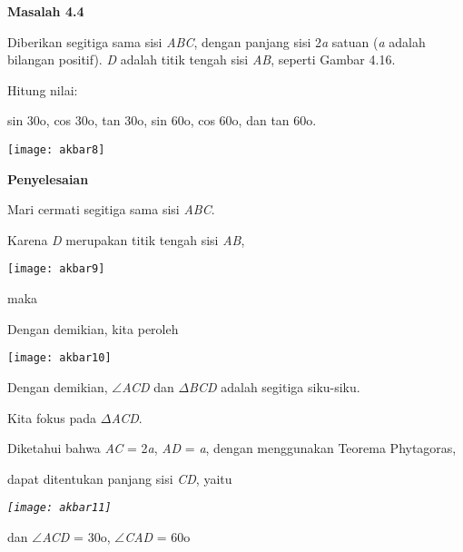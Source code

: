 \documentclass[11pt,fleqn]{book} %
\begin{document}
\noindent 

\noindent \textbf{Masalah 4.4 }

\noindent Diberikan segitiga sama sisi \textit{ABC}, dengan panjang sisi 2\textit{a }satuan (\textit{a }adalah bilangan positif). \textit{D }adalah titik tengah sisi \textit{AB}, seperti Gambar 4.16.\textbf{ }

\noindent Hitung nilai:\textbf{}

\noindent sin 30o, cos 30o, tan 30o, sin 60o, cos 60o, dan tan 60o.

\noindent 

\noindent \texttt{[image: akbar8]}

\noindent 

\noindent \textbf{Penyelesaian}

\noindent Mari cermati segitiga sama sisi \textit{ABC}.

\noindent Karena \textit{D }merupakan titik tengah sisi \textit{AB},

\noindent \texttt{[image: akbar9]}

\noindent maka 

\noindent 

\noindent Dengan demikian, kita peroleh

\noindent \texttt{[image: akbar10]}

\noindent 

\noindent 

 

\noindent 

\noindent Dengan demikian, $\mathrm{\angle }$\textit{ACD }dan $\Delta$\textit{BCD }adalah segitiga siku-siku.

\noindent Kita fokus pada $\Delta$\textit{ACD}.

\noindent Diketahui bahwa \textit{AC }= 2\textit{a}, \textit{AD }= \textit{a}, dengan menggunakan Teorema Phytagoras,

\noindent dapat ditentukan panjang sisi \textit{CD}, yaitu

\noindent 

\noindent \textit{\texttt{[image: akbar11]}}

\noindent \textit{}

\noindent dan $\mathrm{\angle }$\textit{ACD }= 30o, $\mathrm{\angle }$\textit{CAD }= 60o
\end{document}
